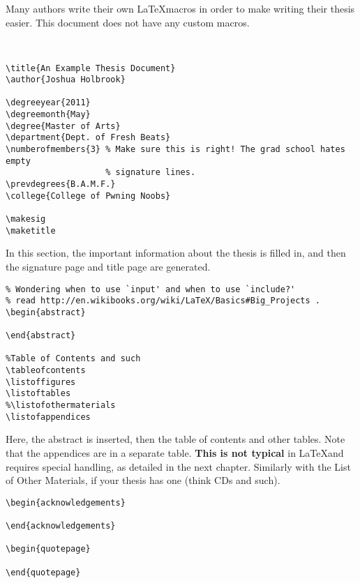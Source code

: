 \small
\begin{verbatim}

\end{verbatim}
\normalsize

Many authors write their own \LaTeX macros in order to make writing their thesis
easier. This document does not have any custom macros.

\small
\begin{verbatim}


\title{An Example Thesis Document}
\author{Joshua Holbrook}

\degreeyear{2011}
\degreemonth{May}
\degree{Master of Arts}
\department{Dept. of Fresh Beats}
\numberofmembers{3} % Make sure this is right! The grad school hates empty
                    % signature lines.
\prevdegrees{B.A.M.F.}
\college{College of Pwning Noobs}

\makesig
\maketitle
\end{verbatim}
\normalsize

In this section, the important information about the thesis is filled in, and
then the signature page and title page are generated.

\small
\begin{verbatim}
% Wondering when to use `input' and when to use `include?'
% read http://en.wikibooks.org/wiki/LaTeX/Basics#Big_Projects .
\begin{abstract}
  
\end{abstract}

%Table of Contents and such
\tableofcontents
\listoffigures
\listoftables
%\listofothermaterials
\listofappendices
\end{verbatim}
\normalsize

Here, the abstract is inserted, then the table of contents and other tables.
Note that the appendices are in a separate table. \textbf{This is not typical}
in \LaTeX and requires special handling, as detailed in the next chapter.
Similarly with the List of Other Materials, if your thesis has one (think
CDs and such).

\small
\begin{verbatim}
\begin{acknowledgements}
  
\end{acknowledgements}

\begin{quotepage}
  
\end{quotepage}




\end{verbatim}
\normalsize

